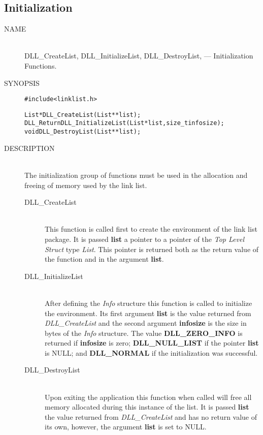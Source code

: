 \documentclass[10pt,letterpaper,titlepage]{article}
\begin{document}
\subsection{Initialization}
\begin{description}
\item[NAME]\quad\\
DLL\_CreateList, DLL\_InitializeList, DLL\_DestroyList, --- Initialization Functions.

\item[SYNOPSIS]
\begin{alltt}

#include <linklist.h>

List *DLL_CreateList(List **list);
DLL_Return DLL_InitializeList(List *list, size_t infosize);
void DLL_DestroyList(List **list);
\end{alltt}

\item[DESCRIPTION]\quad\\
The initialization group of functions must be used in the allocation and freeing of memory used by the link list.

 \begin{description}
 \item[DLL\_CreateList]\quad\\
 This function is called first to create the environment of the link list package.  It is passed \textbf{list} a pointer to a pointer of the \emph{Top Level Struct} type \emph{List}.  This pointer is returned both as the return value of the function and in the argument \textbf{list}.

 \item[DLL\_InitializeList]\quad\\
 After defining the \emph{Info} structure this function is called to initialize the environment.  Its first argument \textbf{list} is the value returned from \emph{DLL\_CreateList} and the second argument \textbf{infosize} is the size in bytes of the \emph{Info} structure.  The value \textbf{DLL\_ZERO\_INFO} is returned if \textbf{infosize} is zero; \textbf{DLL\_NULL\_LIST} if the pointer \textbf{list} is NULL; and \textbf{DLL\_NORMAL} if the initialization was successful.

 \item[DLL\_DestroyList]\quad\\
 Upon exiting the application this function when called will free all memory allocated during this instance of the list.  It is passed \textbf{list} the value returned from \emph{DLL\_CreateList} and has no return value of its own, however, the argument \textbf{list} is set to NULL.
 \end{description}


\end{description}
\end{document}
